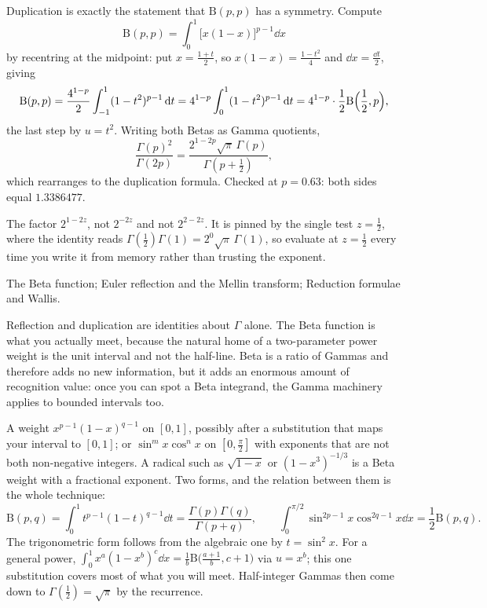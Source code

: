 \begin{worked}
Duplication is exactly the statement that $\mathrm{B}(p,p)$ has a symmetry. Compute
\[\mathrm{B}(p,p)=\int_0^1\bigl[x(1-x)\bigr]^{p-1}\dd x\]
by recentring at the midpoint: put $x=\tfrac{1+t}{2}$, so $x(1-x)=\tfrac{1-t^{2}}{4}$ and $\dd x=\tfrac{\dd t}{2}$, giving
\[\mathrm{B}(p,p)=\frac{4^{1-p}}{2}\int_{-1}^{1}(1-t^{2})^{p-1}\,\mathrm{d} t=4^{1-p}\int_0^1(1-t^{2})^{p-1}\,\mathrm{d} t=4^{1-p}\cdot\frac{1}{2}\mathrm{B}\Bigl(\frac12,p\Bigr),\]
the last step by $u=t^{2}$. Writing both Betas as Gamma quotients,
\[\frac{\Gamma(p)^{2}}{\Gamma(2p)}=\frac{2^{1-2p}\sqrt\pi\,\Gamma(p)}{\Gamma(p+\tfrac12)},\]
which rearranges to the duplication formula. Checked at $p=0.63$: both sides equal $1.3386477$.
\end{worked}

\begin{trap}
The factor $2^{1-2z}$, not $2^{-2z}$ and not $2^{2-2z}$. It is pinned by the single test $z=\tfrac12$, where the identity reads $\Gamma(\tfrac12)\Gamma(1)=2^{0}\sqrt\pi\,\Gamma(1)$, so evaluate at $z=\tfrac12$ every time you write it from memory rather than trusting the exponent.
\end{trap}

\begin{seealsob}The Beta function; Euler reflection and the Mellin transform; Reduction formulae and Wallis.\end{seealsob}

Reflection and duplication are identities about $\Gamma$ alone. The Beta function is what you actually meet, because the natural home of a two-parameter power weight is the unit interval and not the half-line. Beta is a ratio of Gammas and therefore adds no new information, but it adds an enormous amount of recognition value: once you can spot a Beta integrand, the Gamma machinery applies to bounded intervals too.

\cue A weight $x^{p-1}(1-x)^{q-1}$ on $[0,1]$, possibly after a substitution that maps your interval to $[0,1]$; or $\sin^{m}x\cos^{n}x$ on $[0,\tfrac{\pi}{2}]$ with exponents that are not both non-negative integers. A radical such as $\sqrt{1-x}$ or $(1-x^{3})^{-1/3}$ is a Beta weight with a fractional exponent.
\method Two forms, and the relation between them is the whole technique:
\[\mathrm{B}(p,q)=\int_0^1t^{p-1}(1-t)^{q-1}\dd t=\frac{\Gamma(p)\Gamma(q)}{\Gamma(p+q)},\qquad
\int_0^{\pi/2}\sin^{2p-1}x\cos^{2q-1}x\dd x=\frac12\mathrm{B}(p,q).\]
The trigonometric form follows from the algebraic one by $t=\sin^{2}x$. For a general power, $\int_0^1x^{a}(1-x^{b})^{c}\dd x=\tfrac1b\mathrm{B}\bigl(\tfrac{a+1}{b},c+1\bigr)$ via $u=x^{b}$; this one substitution covers most of what you will meet. Half-integer Gammas then come down to $\Gamma(\tfrac12)=\sqrt\pi$ by the recurrence.

